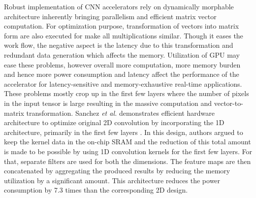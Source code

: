\documentclass[journal]{IEEEtran}
\begin{document}
\par Robust implementation of CNN accelerators rely on dynamically morphable architecture inherently bringing parallelism and efficient matrix vector computation. For optimization purpose, transformation of vectors into matrix form are also executed for make all multiplications similar. Though it eases the work flow, the negative aspect is the latency due to this transformation and redundant data generation which affects the memory. Utilization of GPU may ease these problems, however overall more computation, more memory burden and hence more power consumption and latency affect the performance of the accelerator for latency-sensitive and memory-exhaustive real-time applications. These problems mostly crop up in the first few layers where the number of pixels in the input tensor is large resulting in the massive computation and vector-to-matrix transformation. Sanchez \textit{et al.} demonstrates efficient hardware architecture to optimize original 2D convolution by incorporating the 1D architecture, primarily in the first few layers \cite{paper29}. In this design, authors argued to keep the kernel data in the on-chip SRAM and the reduction of this total amount is made to be possible by using 1D convolution kernels for the first few layers. For that, separate filters are used for both the dimensions. The feature maps are then concatenated by aggregating the produced results by reducing the memory utilization by a significant amount. This architecture reduces the power consumption by 7.3 times than the corresponding 2D design. 
\end{document}
